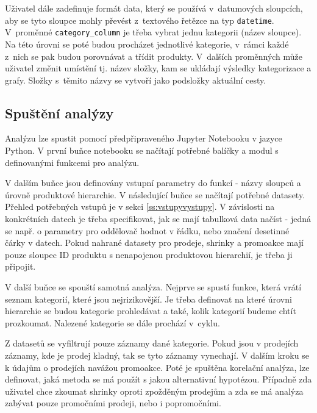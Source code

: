 Uživatel dále zadefinuje formát data, který se používá v~datumových sloupcích, aby se tyto sloupce mohly převést z~textového řetězce na typ \texttt{datetime}. V~proměnné \texttt{category\_column} je třeba vybrat jednu kategorii (název sloupce). Na této úrovni se poté budou procházet jednotlivé kategorie, v~rámci každé z~nich se pak budou porovnávat a třídit produkty. V~dalších proměnných může uživatel změnit umístění tj. název složky, kam se ukládají výsledky kategorizace a grafy. Složky s~těmito názvy se vytvoří jako podsložky aktuální cesty.


\subsection{Spuštění analýzy}

Analýzu lze spustit pomocí předpřipraveného Jupyter Notebooku v jazyce Python. V první buňce notebooku se načítají potřebné balíčky a modul s definovanými funkcemi pro analýzu.

V dalším buňce jsou definovány vstupní parametry do funkcí - názvy sloupců a úrovně produktové hierarchie.
V následující buňce se načítají potřebné datasety. Přehled potřebných vstupů je v sekci \ref*{ss:vstupyvystupy}. V závislosti na konkrétních datech je třeba specifikovat, jak se mají tabulková data načíst - jedná se např. o parametry pro oddělovač hodnot v řádku, nebo značení desetinné čárky v datech. Pokud nahrané datasety pro prodeje, shrinky a promoakce mají pouze sloupec ID produktu s nenapojenou produktovou hierarchií, je třeba ji připojit.

V další buňce se spouští samotná analýza. Nejprve se spustí funkce, která vrátí seznam kategorií, které jsou nejrizikovější. Je třeba definovat na které úrovni hierarchie se budou kategorie prohledávat a také, kolik kategorií budeme chtít prozkoumat.
Nalezené kategorie se dále prochází v~cyklu.

Z datasetů se vyfiltrují pouze záznamy dané kategorie. Pokud jsou v prodejích záznamy, kde je prodej kladný, tak se tyto záznamy vynechají. V dalším kroku se k údajům o prodejích navážou promoakce. Poté je spuštěna korelační analýza, lze definovat, jaká metoda se má použít s jakou alternativní hypotézou. Případně zda uživatel chce zkoumat shrinky oproti zpožděným prodejům a zda se má analýza zabývat pouze promočními prodeji, nebo i popromočními.

